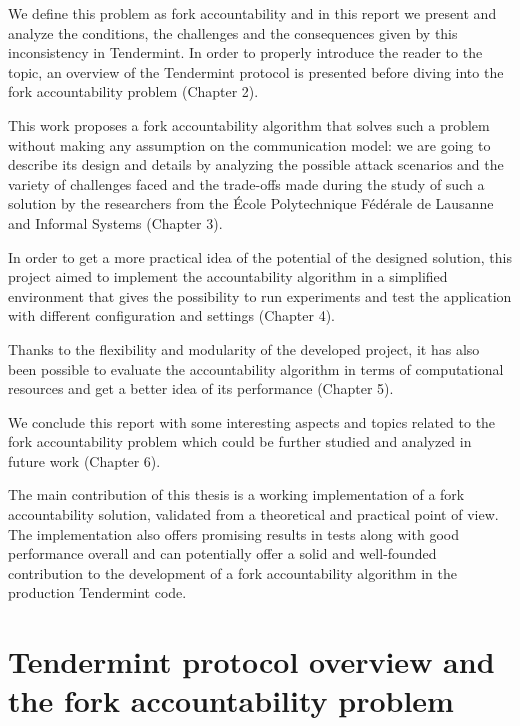 \documentclass[a4paper,11pt,oneside]{report}
\begin{document}
We define this problem as fork accountability and in this report we present and analyze the conditions, the challenges and the consequences given by this inconsistency in Tendermint. In order to properly introduce the reader to the topic, an overview of the Tendermint protocol is presented before diving into the fork accountability problem (Chapter 2). 

This work proposes a fork accountability algorithm that solves such a problem without making any assumption on the communication model: we are going to describe its design and details by analyzing the possible attack scenarios and the variety of challenges faced and the trade-offs made during the study of such a solution by the researchers from the École Polytechnique Fédérale de Lausanne and Informal Systems (Chapter 3). 

In order to get a more practical idea of the potential of the designed solution, this project aimed to implement the accountability algorithm in a simplified environment that gives the possibility to run experiments and test the application with different configuration and settings (Chapter 4). 

Thanks to the flexibility and modularity of the developed project, it has also been possible to evaluate the accountability algorithm in terms of computational resources and get a better idea of its performance (Chapter 5). 

We conclude this report with some interesting aspects and topics related to the fork accountability problem which could be further studied and analyzed in future work (Chapter 6). 

The main contribution of this thesis is a working implementation of a fork accountability solution,  validated from a theoretical and practical point of view. The implementation also offers promising results in tests along with good performance overall and can potentially offer a solid and well-founded contribution to the development of a fork accountability algorithm in the production Tendermint code.

\chapter{Tendermint protocol overview and the fork accountability problem}
\end{document}

